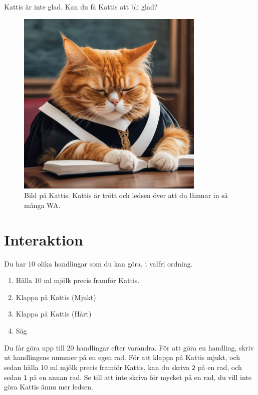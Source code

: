 
Kattis är inte glad. Kan du få Kattis att bli glad?

\begin{centering}
  \begin{figure}[h]
      \centering
      \includegraphics[width=0.8\textwidth]{tired-kattis.png}
      \caption{Bild på Kattis. Kattis är trött och ledsen över att du lämnar in så många WA. }
  \end{figure}
\end{centering}


\section*{Interaktion}
Du har 10 olika handlingar som du kan göra, i valfri ordning. 

\begin{enumerate}
  \item Hälla 10 ml mjölk precis framför Kattis.
  \item Klappa på Kattis (Mjukt)
  \item Klappa på Kattis (Hårt)
  \item Säg 
\end{enumerate}

Du får göra upp till 20 handlingar efter varandra.
För att göra en handling, skriv ut handlingens nummer på en egen rad. För att klappa på Kattis mjukt, 
och sedan hälla 10 ml mjölk precis framför Kattis, kan du skriva \texttt{2} på en rad, och sedan \texttt{1} på en annan rad.
Se till att inte skriva för mycket på en rad, du vill inte göra Kattis ännu mer ledsen. 

